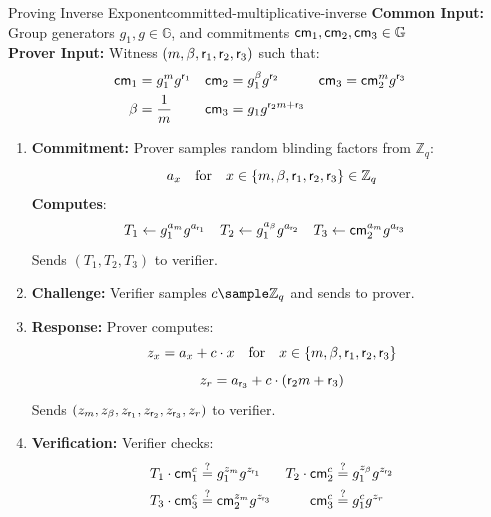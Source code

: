 \begin{protocol}{Proving Inverse Exponent}{committed-multiplicative-inverse}\label{pok-committed-multiplicative-inverse}
\textbf{Common Input:} Group generators $g_1, g \in \mathbb{G}$, and commitments $\mathsf{cm}_1, \mathsf{cm}_2, \mathsf{cm}_3 \in \mathbb{G}$\\
\textbf{Prover Input:} Witness $(m, \beta, \mathsf{r}_1, \mathsf{r}_2, \mathsf{r}_3)$ such that:
    \begin{align*}
        \mathsf{cm}_1 &= g_1^m g^{\mathsf{r}_1}     &    \mathsf{cm}_2 &= g_1^\beta g^{\mathsf{r}_2}  &   \mathsf{cm}_3 &= \mathsf{cm}_2^m g^{\mathsf{r}_3} \\
        \beta &= \frac{1}{m}     &   \mathsf{cm}_3 &= g_1 g^{\mathsf{r}_2 m + \mathsf{r}_3}
    \end{align*}
\begin{enumerate}
    \item \textbf{Commitment:} Prover samples random blinding factors from $\mathbb{Z}_q$:
       \[
        a_x \quad \text{for} \quad x \in \{ m, \beta, \mathsf{r}_1, \mathsf{r}_2, \mathsf{r}_3 \} \in \mathbb{Z}_q
       \]
    \textbf{Computes}:
    \begin{align*}
        T_1 &\gets g_1^{a_m} g^{a_{\mathsf{r}_1}}  &   T_2 &\gets g_1^{a_\beta} g^{a_{\mathsf{r}_2}}     &   T_3 &\gets \mathsf{cm}_2^{a_m} g^{a_{\mathsf{r}_3}}
    \end{align*}
    Sends $(T_1, T_2, T_3)$ to verifier.
    
    \item \textbf{Challenge:} Verifier samples $c \sample \mathbb{Z}_q$ and sends to prover.
    
    \item \textbf{Response:} Prover computes:
    \[
    z_x = a_x + c \cdot x \quad \text{for} \quad x \in \{ m, \beta, \mathsf{r}_1, \mathsf{r}_2, \mathsf{r}_3 \}
    \]
    \[
    z_r = a_{\mathsf{r}_3} + c \cdot (\mathsf{r}_2 m + \mathsf{r}_3)
    \]
    Sends $(z_m, z_\beta, z_{\mathsf{r}_1}, z_{\mathsf{r}_2}, z_{\mathsf{r}_3}, z_r)$ to verifier.
    
    \item \textbf{Verification:} Verifier checks:
    \begin{align*}
        T_1 \cdot \mathsf{cm}_1^c &\stackrel{?}{=} g_1^{z_m} g^{z_{\mathsf{r}_1}}  &
        T_2 \cdot \mathsf{cm}_2^c &\stackrel{?}{=} g_1^{z_\beta} g^{z_{\mathsf{r}_2}} \\
        T_3 \cdot \mathsf{cm}_3^c &\stackrel{?}{=} \mathsf{cm}_2^{z_m} g^{z_{\mathsf{r}_3}} &
        \mathsf{cm}_3^c &\stackrel{?}{=} g_1^c g^{z_r}
    \end{align*}
\end{enumerate}
\end{protocol}


